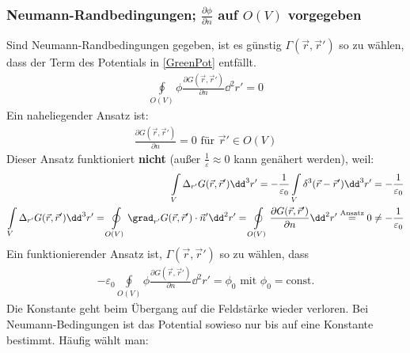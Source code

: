   \subsubsection{Neumann-Randbedingungen; $\frac{\partial \phi}{\partial n}$ auf $O(V)$ vorgegeben}
		   Sind Neumann-Randbedingungen gegeben, ist es günstig $\Gamma(\vec{r} ,\vec{r}' )$ so zu wählen, dass der Term des Potentials in \ref{GreenPot} entfällt.
		        \begin{equation}\begin{split}
				        \oint\limits_{O(V)} \phi\frac{\partial G(\vec{r} ,\vec{r}' )}{\partial n} \dd^2r' = 0
			        \end{split}\end{equation}
		    Ein naheliegender Ansatz ist:
		        \begin{equation}\begin{split}
				        \frac{\partial G(\vec{r} ,\vec{r}' )}{\partial n} = 0 \text{ für } \vec{r}'  \in O(V)
			        \end{split}\end{equation}
		   Dieser Ansatz funktioniert \textbf{nicht} (außer $\frac{1}{\varepsilon}\approx 0$ kann genähert werden), weil:
		        \begin{equation}\label{ansNEU}\begin{split}
				        \int\limits_V \Delta _{r'}G(\vec{r} ,\vec{r}' ) \dd^3 r' = -\frac{1}{\varepsilon_0} \int\limits_V \delta^3(\vec{r} -\vec{r}' ) \dd^3 r' &= -\frac{1}{\varepsilon_0}\\
				        \int\limits_V \Delta _{r'}G(\vec{r} ,\vec{r}' ) \dd^3 r' = \oint\limits_{O(V)} \grad _{r'}G(\vec{r} ,\vec{r}' ) \cdot\vec{n}' \dd^2 r' = \oint\limits_{O(V)} \frac{\partial G(\vec{r} ,\vec{r}' )}{\partial n} \dd^2 r'\stackrel{\text{Ansatz}}{=}0&\neq -\frac{1}{\varepsilon_0}
			        \end{split}\end{equation}
		    Ein funktionierender Ansatz ist, $\Gamma(\vec{r} ,\vec{r}' )$ so zu wählen, dass
		        \begin{equation}\begin{split}
				        -\varepsilon_0 \oint\limits_{O(V)} \phi\frac{\partial G(\vec{r} ,\vec{r}' )}{\partial n} \dd^2r' = \phi_0 \text{ mit } \phi_0 = \text{const.}
			        \end{split}\end{equation}
		    Die Konstante geht beim Übergang auf die Feldstärke wieder verloren. Bei Neumann-Bedingungen ist das Potential sowieso nur bis auf eine Konstante bestimmt. Häufig wählt man:
